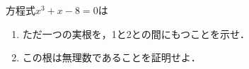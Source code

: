 \documentclass[../../main.tex]{subfiles}
\begin{document}
方程式$x^3+x-8=0$は
\begin{enumerate}
  \item ただ一つの実根を，1と2との間にもつことを示せ．
  \item この根は無理数であることを証明せよ．
\end{enumerate}
\end{document}

